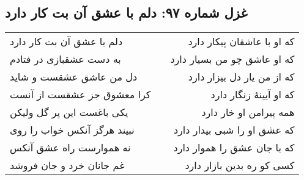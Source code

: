 \begin{center}
\section*{غزل شماره ۹۷: دلم با عشق آن بت کار دارد}
\label{sec:097}
\begin{longtable}{l p{0.5cm} r}
دلم با عشق آن بت کار دارد
&&
که او با عاشقان پیکار دارد
\\
به دست عشقبازی در فتادم
&&
که او عاشق چو من بسیار دارد
\\
دل من عاشق عشقست و شاید
&&
که از من یار دل بیزار دارد
\\
کرا معشوق جز عشقست از آنست
&&
که او آیینهٔ زنگار دارد
\\
یکی باغست این پر گل ولیکن
&&
همه پیرامن او خار دارد
\\
نبیند هرگز آنکس خواب را روی
&&
که عشق او را شبی بیدار دارد
\\
نه هموارست راه عشق آنکس
&&
که با جان عشق را هموار دارد
\\
غم جانان خرد و جان فروشد
&&
کسی کو ره بدین بازار دارد
\\
\end{longtable}
\end{center}
